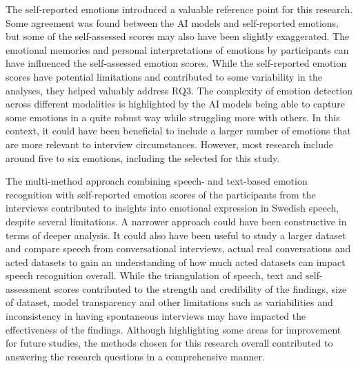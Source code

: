 The self-reported emotions introduced a valuable reference point for this research. Some agreement was found between the AI models and self-reported emotions, but some of the self-assessed scores may also have been slightly exaggerated. The emotional memories and personal interpretations of emotions by participants can have influenced the self-assessed emotion scores.
While the self-reported emotion scores have potential limitations and contributed to some variability in the analyses, they helped valuably address RQ3. The complexity of emotion detection across different modalities is highlighted by the AI models being able to capture some emotions in a quite robust way while struggling more with others. In this context, it could have been beneficial to include a larger number of emotions that are more relevant to interview circumstances. However, most research include around five to six emotions, including the selected for this study. 

\medskip
The multi-method approach combining speech- and text-based emotion recognition with self-reported emotion scores of the participants from the interviews contributed to insights into emotional expression in Swedish speech, despite several limitations. A narrower approach could have been constructive in terms of deeper analysis. It could also have been useful to study a larger dataset and compare speech from conversational interviews, actual real conversations and acted datasets to gain an understanding of how much acted datasets can impact speech recognition overall.  
While the triangulation of speech, text and self-assessment scores contributed to the strength and credibility of the findings, size of dataset, model transparency and other limitations such as variabilities and inconsistency in having spontaneous interviews may have impacted the effectiveness of the findings. Although highlighting some areas for improvement for future studies, the methods chosen for this research overall contributed to answering the research questions in a comprehensive manner.
